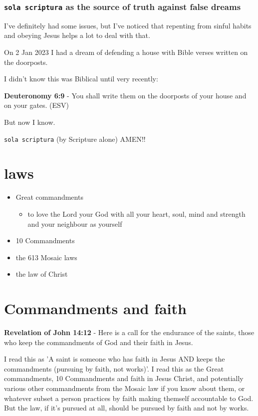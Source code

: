 \documentclass[11pt]{article}
\begin{document}
\subsubsection{\texttt{sola scriptura} as the source of truth against false dreams}
\label{sec:orgc171482}
I've definitely had some issues, but I've noticed that repenting from sinful habits and obeying Jesus helps a lot to deal with that.

On 2 Jan 2023 I had a dream of defending a house with Bible verses written
on the doorposts.

I didn't know this was Biblical until very recently:

\textbf{Deuteronomy 6:9} -  You shall write them on the doorposts of your house and on your gates.  (ESV)

But now I know.

\texttt{sola scriptura} (by Scripture alone) AMEN!!

\section{laws}
\label{sec:org96b2a17}
\begin{itemize}
\item Great commandments
\begin{itemize}
\item to love the Lord your God with all your heart, soul, mind and strength and your neighbour as yourself
\end{itemize}
\item 10 Commandments
\item the 613 Mosaic laws
\item the law of Christ
\end{itemize}

\section{Commandments and faith}
\label{sec:org658bc89}
\textbf{Revelation of John 14:12} - Here is a call for the endurance of the saints, those who keep the commandments of God and their faith in Jesus.

I read this as 'A saint is someone who has faith in Jesus AND keeps the commandments (pursuing by faith, not works)'.
I read this as the Great commandments, 10 Commandments and faith in Jesus Christ, and potentially various other commandments from the Mosaic law if you know about them, or whatever subset a person practices by faith making themself accountable to God.
But the law, if it's pursued at all, should be pursued by faith and not by works.
\end{document}
